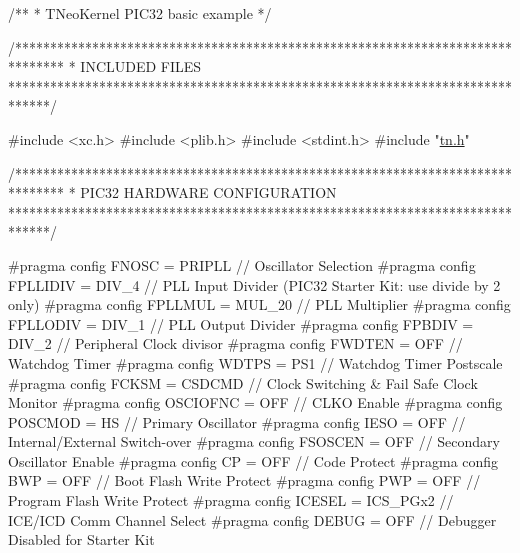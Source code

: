 \begin{DoxyCodeInclude}
\textcolor{comment}{/**}
\textcolor{comment}{ * TNeoKernel PIC32 basic example}
\textcolor{comment}{ */}

\textcolor{comment}{/*******************************************************************************}
\textcolor{comment}{ *    INCLUDED FILES}
\textcolor{comment}{ ******************************************************************************/}

\textcolor{preprocessor}{#include <xc.h>}
\textcolor{preprocessor}{#include <plib.h>}
\textcolor{preprocessor}{#include <stdint.h>}
\textcolor{preprocessor}{#include "\hyperlink{tn_8h}{tn.h}"}




\textcolor{comment}{/*******************************************************************************}
\textcolor{comment}{ *    PIC32 HARDWARE CONFIGURATION}
\textcolor{comment}{ ******************************************************************************/}

\textcolor{preprocessor}{#pragma config FNOSC    = PRIPLL        // Oscillator Selection}
\textcolor{preprocessor}{#pragma config FPLLIDIV = DIV\_4         // PLL Input Divider (PIC32 Starter Kit: use divide by 2 only)}
\textcolor{preprocessor}{#pragma config FPLLMUL  = MUL\_20        // PLL Multiplier}
\textcolor{preprocessor}{#pragma config FPLLODIV = DIV\_1         // PLL Output Divider}
\textcolor{preprocessor}{#pragma config FPBDIV   = DIV\_2         // Peripheral Clock divisor}
\textcolor{preprocessor}{#pragma config FWDTEN   = OFF           // Watchdog Timer}
\textcolor{preprocessor}{#pragma config WDTPS    = PS1           // Watchdog Timer Postscale}
\textcolor{preprocessor}{#pragma config FCKSM    = CSDCMD        // Clock Switching & Fail Safe Clock Monitor}
\textcolor{preprocessor}{#pragma config OSCIOFNC = OFF           // CLKO Enable}
\textcolor{preprocessor}{#pragma config POSCMOD  = HS            // Primary Oscillator}
\textcolor{preprocessor}{#pragma config IESO     = OFF           // Internal/External Switch-over}
\textcolor{preprocessor}{#pragma config FSOSCEN  = OFF           // Secondary Oscillator Enable}
\textcolor{preprocessor}{#pragma config CP       = OFF           // Code Protect}
\textcolor{preprocessor}{#pragma config BWP      = OFF           // Boot Flash Write Protect}
\textcolor{preprocessor}{#pragma config PWP      = OFF           // Program Flash Write Protect}
\textcolor{preprocessor}{#pragma config ICESEL   = ICS\_PGx2      // ICE/ICD Comm Channel Select}
\textcolor{preprocessor}{#pragma config DEBUG    = OFF           // Debugger Disabled for Starter Kit}





\end{DoxyCodeInclude}
